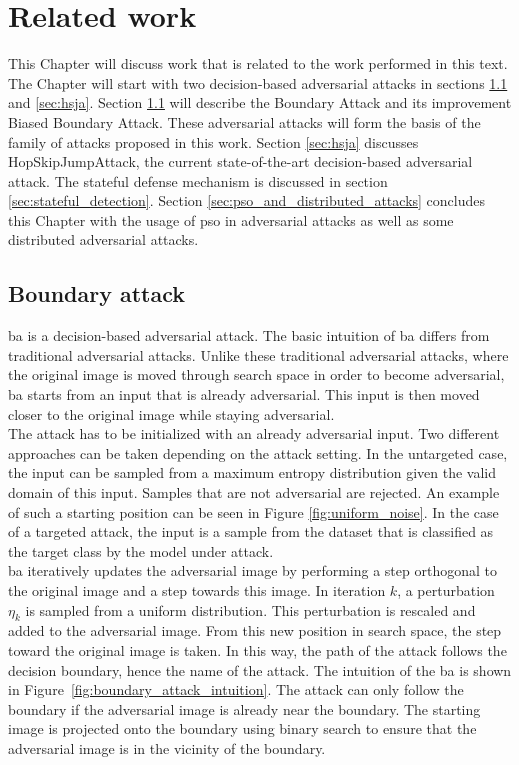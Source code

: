\chapter{Related work}\label{chap:related_work}
This Chapter will discuss work that is related to the work performed in this text. The Chapter will start with two decision-based adversarial attacks in sections \ref{sec:ba} and \ref{sec:hsja}. Section \ref{sec:ba} will describe the Boundary Attack and its improvement Biased Boundary Attack. These adversarial attacks will form the basis of the family of attacks proposed in this work. Section \ref{sec:hsja} discusses HopSkipJumpAttack, the current state-of-the-art decision-based adversarial attack. The stateful defense mechanism is discussed in section \ref{sec:stateful_detection}. Section \ref{sec:pso_and_distributed_attacks} concludes this Chapter with the usage of \gls{pso} in adversarial attacks as well as some distributed adversarial attacks.

\section{Boundary attack}\label{sec:ba}
\gls{ba} \cite{boundary_attack} is a decision-based adversarial attack. The basic intuition of \gls{ba} differs from traditional adversarial attacks. Unlike these traditional adversarial attacks, where the original image is moved through search space in order to become adversarial, \gls{ba} starts from an input that is already adversarial. This input is then moved closer to the original image while staying adversarial.\\

The attack has to be initialized with an already adversarial input. Two different approaches can be taken depending on the attack setting. In the untargeted case, the input can be sampled from a maximum entropy distribution given the valid domain of this input. Samples that are not adversarial are rejected. An example of such a starting position can be seen in Figure \ref{fig:uniform_noise}. In the case of a targeted attack, the input is a sample from the dataset that is classified as the target class by the model under attack.\\

\gls{ba} iteratively updates the adversarial image by performing a step orthogonal to the original image and a step towards this image. In iteration $k$, a perturbation $\eta_k$ is sampled from a uniform distribution. This perturbation is rescaled and added to the adversarial image. From this new position in search space, the step toward the original image is taken. In this way, the path of the attack follows the decision boundary, hence the name of the attack. The intuition of the \gls{ba} is shown in Figure~\ref{fig:boundary_attack_intuition}. The attack can only follow the boundary if the adversarial image is already near the boundary. The starting image is projected onto the boundary using binary search to ensure that the adversarial image is in the vicinity of the boundary.\\

